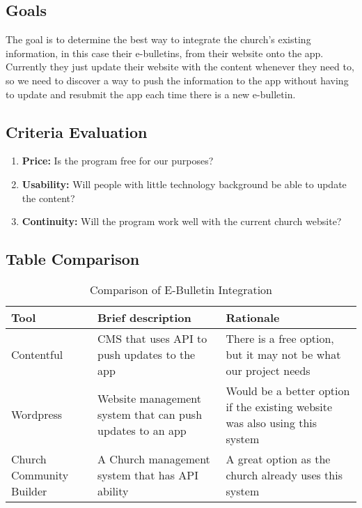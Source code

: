 \documentclass[letterpaper,10pt,draftclsnofoot,onecolumn,titlepage]{IEEEtran}
\begin{document}
	\subsection{Goals}
	The goal is to determine the best way to integrate the church's existing information, in this case their e-bulletins, from their website onto the app. 
	Currently they just update their website with the content whenever they need to, so we need to discover a way to push the information to the app without having to update and resubmit the app each time there is a new e-bulletin. 
	 
	\subsection{Criteria Evaluation}
		\begin{enumerate}
			\item \textbf{Price:} Is the program free for our purposes? 
			\item \textbf{Usability:} Will people with little technology background be able to update the content? 
			\item \textbf{Continuity:} Will the program work well with the current church website? 
		\end{enumerate}
	\subsection{Table Comparison}
	\begin{table}[ht]
	\caption{Comparison of E-Bulletin Integration}
	\begin{center}
	\begin{tabular} { | m{3cm} | m{5cm} | m{5cm} | }
	\hline\hline
	Tool & Brief description & Rationale \\ [0.5ex]
	\hline
	Contentful & CMS that uses API to push updates to the app & There is a free option, but it may not be what our project needs \\
	\hline
	Wordpress & Website management system that can push updates to an app & Would be a better option if the existing website was also using this system \\
	\hline
	Church Community Builder & A Church management system that has API ability & A great option as the church already uses this system \\
	\hline
	\end{tabular}
	\end{center}
	\end{table}
\end{document}
